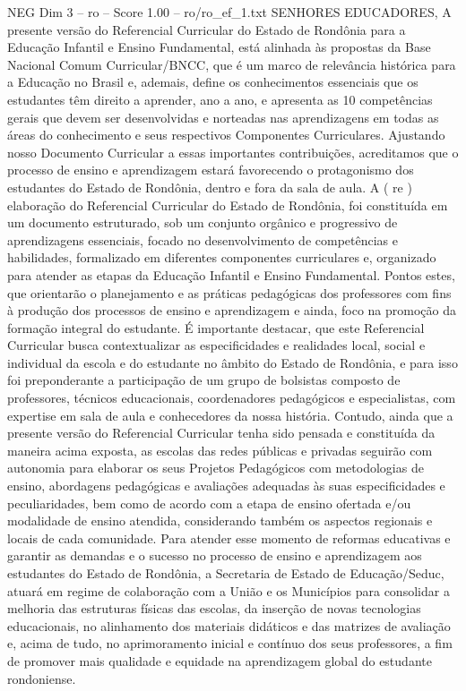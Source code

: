 \begin{textsample}{NEG Dim 3 – ro – Score 1.00 – ro/ro\_ef\_1.txt}  \label{ex:f3_neg_158}
SENHORES EDUCADORES, A presente versão do Referencial Curricular do Estado de Rondônia para a Educação Infantil e Ensino Fundamental, está alinhada às propostas da Base Nacional Comum Curricular/BNCC, que é um marco de relevância histórica para a Educação no Brasil e, ademais, define os conhecimentos essenciais que os estudantes têm direito a aprender, ano a ano, e apresenta as 10 competências gerais que devem ser desenvolvidas e norteadas nas aprendizagens em todas as áreas do conhecimento e seus respectivos Componentes Curriculares.
Ajustando nosso Documento Curricular a essas importantes contribuições, acreditamos que o processo de ensino e aprendizagem estará favorecendo o protagonismo dos estudantes do Estado de Rondônia, dentro e fora da sala de aula.
A ( re ) elaboração do Referencial Curricular do Estado de Rondônia, foi constituída em um documento estruturado, sob um conjunto orgânico e progressivo de aprendizagens essenciais, focado no desenvolvimento de competências e habilidades, formalizado em diferentes componentes curriculares e, organizado para atender as etapas da Educação Infantil e Ensino Fundamental.
Pontos estes, que orientarão o planejamento e as práticas pedagógicas dos professores com fins à produção dos processos de ensino e aprendizagem e ainda, foco na promoção da formação integral do estudante.
É importante destacar, que este Referencial Curricular busca contextualizar as especificidades e realidades local, social e individual da escola e do estudante no âmbito do Estado de Rondônia, e para isso foi preponderante a participação de um grupo de bolsistas composto de professores, técnicos educacionais, coordenadores pedagógicos e especialistas, com expertise em sala de aula e conhecedores da nossa história.
Contudo, ainda que a presente versão do Referencial Curricular tenha sido pensada e constituída da maneira acima exposta, as escolas das redes públicas e privadas seguirão com autonomia para elaborar os seus Projetos Pedagógicos com metodologias de ensino, abordagens pedagógicas e avaliações adequadas às suas especificidades e peculiaridades, bem como de acordo com a etapa de ensino ofertada e/ou modalidade de ensino atendida, considerando também os aspectos regionais e locais de cada comunidade.
Para atender esse momento de reformas educativas e garantir as demandas e o sucesso no processo de ensino e aprendizagem aos estudantes do Estado de Rondônia, a Secretaria de Estado de Educação/Seduc, atuará em regime de colaboração com a União e os Municípios para consolidar a melhoria das estruturas físicas das escolas, da inserção de novas tecnologias educacionais, no alinhamento dos materiais didáticos e das matrizes de avaliação e, acima de tudo, no aprimoramento inicial e contínuo dos seus professores, a fim de promover mais qualidade e equidade na aprendizagem global do estudante rondoniense.

\end{textsample}
